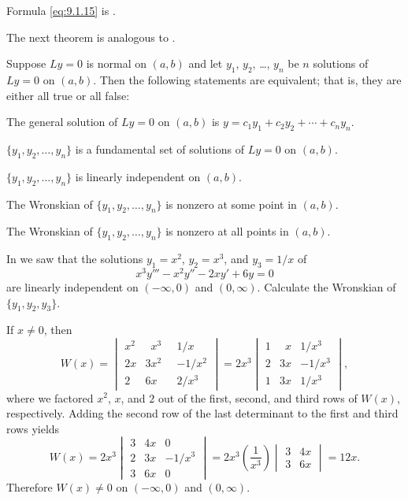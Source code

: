 Formula \eqref{eq:9.1.15} is
.

The next theorem is analogous to
.

\begin{theorem}\label{thmtype:9.1.4}
Suppose $Ly=0$ is normal on $(a,b)$ and let $y_1$, $y_2$, \dots, $y_n$
be $n$ solutions of $Ly=0$ on $(a,b)$. Then the following statements
are equivalent;  that is, they are either all true or all false:
\begin{alist}
\item %
The general solution of $Ly=0$ on $(a,b)$ is
$y=c_1y_1+c_2y_2+\cdots+c_ny_n$.
\item %
 $\{y_1,y_2,\dots,y_n\}$ is a fundamental set of solutions of
$Ly=0$ on $(a,b)$.
\item %
$\{y_1,y_2,\dots,y_n\}$ is linearly independent on $(a,b)$.
\item %
The Wronskian of $\{y_1,y_2,\dots,y_n\}$ is nonzero at some point in
$(a,b)$.
\item %
The Wronskian of $\{y_1,y_2,\dots,y_n\}$ is nonzero at all points in
$(a,b)$.
\end{alist}
\end{theorem}

\begin{example}\label{example:9.1.3}
In  we saw that the solutions $y_1=x^2$,
$y_2=x^3$, and $y_3=1/x$ of
\[
x^3y'''-x^2y''-2xy'+6y=0
\]
are linearly independent on $(-\infty,0)$ and $(0,\infty)$. Calculate
the Wronskian of $\{y_1,y_2,y_3\}$.
\end{example}

\begin{solution}
If $x\ne0$, then
\[
W(x)=\begin{vmatrix}
x^2&\phantom{2}x^3&1/x\\
2x&3x^2\phantom{^2}&-1/x^2\\
2&6x\phantom{x^2}&2/x^3
\end{vmatrix}
=2x^3\begin{vmatrix}
1&\phantom{3}x&1/x^3\\
2&3x&-1/x^3\\
1&3x&1/x^3
\end{vmatrix},
\]
where we factored $x^2$, $x$, and $2$ out of the first, second, and
third  rows of
$W(x)$, respectively. Adding the second row of the last determinant
to the first and third rows yields
\[
W(x)=2x^3\begin{vmatrix}
3&4x&0\\
2&3x&-1/x^3\\
3&6x&0
\end{vmatrix}
=2x^3\left(\frac{1}{x^3}\right)\begin{vmatrix}3&4x\\3&6x\end{vmatrix}
=12x.
\]
Therefore $W(x)\ne0$ on $(-\infty,0)$ and $(0,\infty)$.
\end{solution}

